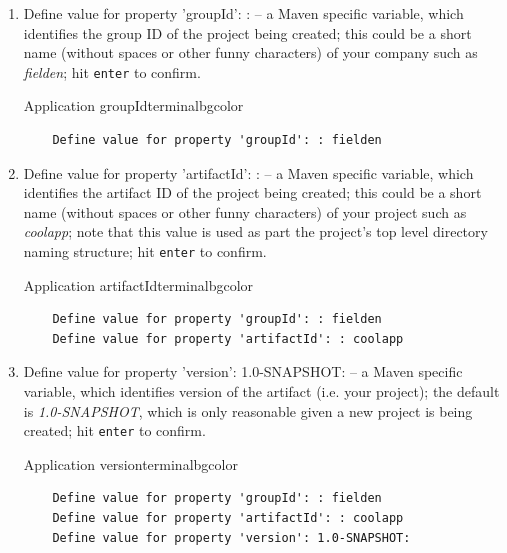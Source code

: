   \begin{enumerate}
    \item Define value for property 'groupId': : -- a Maven specific variable, which identifies the group ID of the project being created; this could be a short name (without spaces or other funny characters) of your company such as \emph{fielden}; hit \texttt{enter} to confirm.
      
    \begin{code}{Application groupId}{\label{lst:archetype-groupId}}{terminalbgcolor}
      \begin{lstlisting}
	Define value for property 'groupId': : fielden		
      \end{lstlisting}
    \end{code}

    \item Define value for property 'artifactId': : -- a Maven specific variable, which identifies the artifact ID of the project being created; this could be a short name (without spaces or other funny characters) of your project such as \emph{coolapp}; note that this value is used as part the project's top level directory naming structure; hit \texttt{enter} to confirm.
    
    \begin{code}{Application artifactId}{\label{lst::archetype-archetypeId}}{terminalbgcolor}
      \begin{lstlisting}
	Define value for property 'groupId': : fielden		
	Define value for property 'artifactId': : coolapp
      \end{lstlisting}
    \end{code}

    \item Define value for property 'version': 1.0-SNAPSHOT: -- a Maven specific variable, which identifies version of the artifact (i.e. your project); the default is \emph{1.0-SNAPSHOT}, which is only reasonable given a new project is being created; hit \texttt{enter} to confirm.
    
    \begin{code}{Application version}{\label{lst::archetype-version}}{terminalbgcolor}
      \begin{lstlisting}
	Define value for property 'groupId': : fielden		
	Define value for property 'artifactId': : coolapp
	Define value for property 'version': 1.0-SNAPSHOT:
      \end{lstlisting}
    \end{code}


\end{enumerate}
